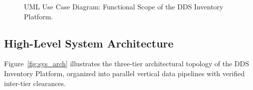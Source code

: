 \begin{figure}[htbp]
\caption{UML Use Case Diagram: Functional Scope of the DDS Inventory Platform.}
\label{fig:use_case}
\end{figure}

\subsection{High-Level System Architecture}
Figure~\ref{fig:sys_arch} illustrates the three-tier architectural topology of the DDS Inventory Platform, organized into parallel vertical data pipelines with verified inter-tier clearances.

